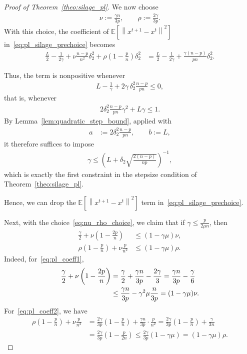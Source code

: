 \documentclass{article}
\newcommand{\bb}{\mathbb}
\newcommand{\sqn}[1]{\left\| #1 \right\|^2}
\newcommand{\eqdef}{:=}
\newcommand{\Exp}[1]{{\bb E}\left[#1\right]}
\theoremstyle{plain}
\begin{document}
\begin{proof}[Proof of Theorem~\ref{theo:silage_pl}]
We now choose
\begin{align}
\label{eq:nu_rho_choice}
\nu \eqdef \frac{\gamma n}{3p},
\qquad
\rho \eqdef \frac{2\gamma}{3p}.
\end{align}
With this choice, the coefficient of $\Exp{\sqn{x^{t+1}-x^t}}$ in~\eqref{eq:pl_silage_prechoice} becomes
\begin{align*}
\frac{L}{2}-\frac{1}{2\gamma}
+\nu\frac{n-p}{n^2}\delta_2^2
+\rho\left(1-\frac{p}{n}\right)\delta_2^2
&=\frac{L}{2}-\frac{1}{2\gamma}
+\frac{\gamma(n-p)}{pn}\delta_2^2.
\end{align*}

Thus, the term is nonpositive whenever
\begin{align*}
L-\frac{1}{\gamma}+2\gamma\,\delta_2^2\frac{n-p}{pn}\leq 0,
\end{align*}
that is, whenever
\begin{align*}
2\delta_2^2\frac{n-p}{pn}\gamma^2+L\gamma\leq 1.
\end{align*}
By Lemma~\ref{lem:quadratic_step_bound}, applied with
\begin{align*}
a &\eqdef 2\delta_2^2\frac{n-p}{pn},
\qquad
b \eqdef L,
\end{align*}
it therefore suffices to impose
\begin{align*}
\gamma \leq \left(L+\delta_2\sqrt{\frac{2(n-p)}{np}}\right)^{-1},
\end{align*}
which is exactly the first constraint in the stepsize condition of Theorem~\ref{theo:silage_pl}.


Hence, we can drop the $\Exp{\sqn{x^{t+1}-x^t}}$ term in~\eqref{eq:pl_silage_prechoice}.

Next, with the choice~\eqref{eq:nu_rho_choice}, we claim that if $\gamma \leq \frac{p}{2\mu n}$, then
\begin{align}
\frac{\gamma}{2}+\nu\left(1-\frac{2p}{n}\right) &\leq (1-\gamma\mu)\nu,
\label{eq:pl_coeff1}\\
\rho\left(1-\frac{p}{n}\right)+\nu\frac{p}{n^2} &\leq (1-\gamma\mu)\rho.
\label{eq:pl_coeff2}
\end{align}
Indeed, for~\eqref{eq:pl_coeff1},
\begin{align*}
\frac{\gamma}{2}+\nu\left(1-\frac{2p}{n}\right)
&=\frac{\gamma}{2}+\frac{\gamma n}{3p}-\frac{2\gamma}{3}
=\frac{\gamma n}{3p}-\frac{\gamma}{6} \notag\\
&\leq \frac{\gamma n}{3p}-\gamma^2\mu\frac{n}{3p}
=(1-\gamma\mu)\nu.
\end{align*}
For~\eqref{eq:pl_coeff2}, we have
\begin{align*}
\rho\left(1-\frac{p}{n}\right)+\nu\frac{p}{n^2}
&=\frac{2\gamma}{3p}\left(1-\frac{p}{n}\right)+\frac{\gamma n}{3p}\cdot \frac{p}{n^2}
=\frac{2\gamma}{3p}\left(1-\frac{p}{n}\right)+\frac{\gamma}{3n}\\
&=\frac{2\gamma}{3p}\left(1-\frac{p}{2n}\right)
\leq \frac{2\gamma}{3p}(1-\gamma\mu)
=(1-\gamma\mu)\rho.
\end{align*}


\end{proof}
\end{document}
